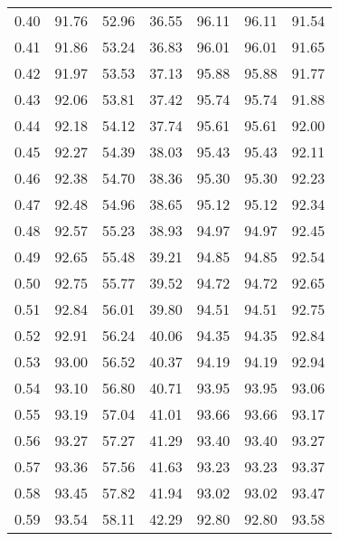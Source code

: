 \begin{tabular}{|c|c|c|c|c|c|c|}
      0.40 &     91.76 &     52.96 &      36.55 &   96.11 &      96.11 &         91.54 \\
      0.41 &     91.86 &     53.24 &      36.83 &   96.01 &      96.01 &         91.65 \\
      0.42 &     91.97 &     53.53 &      37.13 &   95.88 &      95.88 &         91.77 \\
      0.43 &     92.06 &     53.81 &      37.42 &   95.74 &      95.74 &         91.88 \\
      0.44 &     92.18 &     54.12 &      37.74 &   95.61 &      95.61 &         92.00 \\
      0.45 &     92.27 &     54.39 &      38.03 &   95.43 &      95.43 &         92.11 \\
      0.46 &     92.38 &     54.70 &      38.36 &   95.30 &      95.30 &         92.23 \\
      0.47 &     92.48 &     54.96 &      38.65 &   95.12 &      95.12 &         92.34 \\
      0.48 &     92.57 &     55.23 &      38.93 &   94.97 &      94.97 &         92.45 \\
      0.49 &     92.65 &     55.48 &      39.21 &   94.85 &      94.85 &         92.54 \\
      0.50 &     92.75 &     55.77 &      39.52 &   94.72 &      94.72 &         92.65 \\
      0.51 &     92.84 &     56.01 &      39.80 &   94.51 &      94.51 &         92.75 \\
      0.52 &     92.91 &     56.24 &      40.06 &   94.35 &      94.35 &         92.84 \\
      0.53 &     93.00 &     56.52 &      40.37 &   94.19 &      94.19 &         92.94 \\
      0.54 &     93.10 &     56.80 &      40.71 &   93.95 &      93.95 &         93.06 \\
      0.55 &     93.19 &     57.04 &      41.01 &   93.66 &      93.66 &         93.17 \\
      0.56 &     93.27 &     57.27 &      41.29 &   93.40 &      93.40 &         93.27 \\
      0.57 &     93.36 &     57.56 &      41.63 &   93.23 &      93.23 &         93.37 \\
      0.58 &     93.45 &     57.82 &      41.94 &   93.02 &      93.02 &         93.47 \\
      0.59 &     93.54 &     58.11 &      42.29 &   92.80 &      92.80 &         93.58 \\

\end{tabular}
